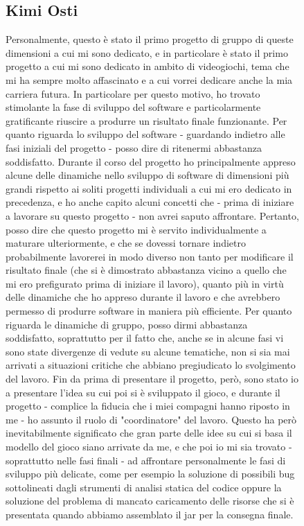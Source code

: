 \documentclass[a4paper,12pt]{report}
\begin{document}
\begin{figure}[H]
\subsection{Kimi Osti}
Personalmente, questo è stato il primo progetto di gruppo di queste dimensioni a cui mi sono dedicato, e in particolare è stato il primo progetto a cui mi sono dedicato in ambito di videogiochi, tema che mi ha sempre molto affascinato e a cui vorrei dedicare anche la mia carriera futura. In particolare per questo motivo, ho trovato stimolante la fase di sviluppo del software e particolarmente gratificante riuscire a produrre un risultato finale funzionante.
\newline Per quanto riguarda lo sviluppo del software - guardando indietro alle fasi iniziali del progetto - posso dire di ritenermi abbastanza soddisfatto. Durante il corso del progetto ho principalmente appreso alcune delle dinamiche nello sviluppo di software di dimensioni più grandi rispetto ai soliti progetti individuali a cui mi ero dedicato in precedenza, e ho anche capito alcuni concetti che - prima di iniziare a lavorare su questo progetto - non avrei saputo affrontare. Pertanto, posso dire che questo progetto mi è servito individualmente a maturare ulteriormente, e che se dovessi tornare indietro probabilmente lavorerei in modo diverso non tanto per modificare il risultato finale (che si è dimostrato abbastanza vicino a quello che mi ero prefigurato prima di iniziare il lavoro), quanto più in virtù delle dinamiche che ho appreso durante il lavoro e che avrebbero permesso di produrre software in maniera più efficiente.
\newline Per quanto riguarda le dinamiche di gruppo, posso dirmi abbastanza soddisfatto, soprattutto per il fatto che, anche se in alcune fasi vi sono state divergenze di vedute su alcune tematiche, non si sia mai arrivati a situazioni critiche che abbiano pregiudicato lo svolgimento del lavoro. Fin da prima di presentare il progetto, però, sono stato io a presentare l'idea su cui poi si è sviluppato il gioco, e durante il progetto - complice la fiducia che i miei compagni hanno riposto in me - ho assunto il ruolo di "coordinatore" del lavoro. Questo ha però inevitabilmente significato che gran parte delle idee su cui si basa il modello del gioco siano arrivate da me, e che poi io mi sia trovato - soprattutto nelle fasi finali - ad affrontare personalmente le fasi di sviluppo più delicate, come per esempio la soluzione di possibili bug sottolineati dagli strumenti di analisi statica del codice oppure la soluzione del problema di mancato caricamento delle risorse che si è presentata quando abbiamo assemblato il jar per la consegna finale.

\end{figure}
\end{document}

